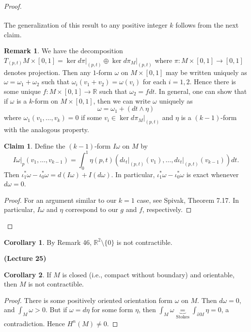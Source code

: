 \documentclass[10pt,letterpaper,cm]{nupset}
\theoremstyle{definition}
\newtheorem{claim}{Claim}
\newtheorem{remark}{Remark}
\newtheorem{corollary}{Corollary}
\newcommand{\R}{\mathbb R}
\newcommand{\1}{\mathbf{1}}
\newcommand{\0}{\vec 0}
\begin{document}
\begin{proof}
\\ \\
The generalization of this result to any positive integer $k$ follows from the next claim.
\begin{remark}
We have the decomposition $T_{(p,t)}M \times [0,1] = \ker d\pi\rvert_{(p,t)} \oplus \ker d\pi_M\rvert_{(p,t)}$ where $\pi: M \times [0,1]\to [0,1]$ denotes projection. Then any $1$-form $\omega$ on $M \times [0,1]$ may be written uniquely as $\omega = \omega_1 + \omega_2$ such that $\omega_i(v_1 + v_2) = \omega(v_i)$ for each $i=1, 2$. Hence there is some unique $f : M \times [0,1] \to \R$ such that $\omega_2 = f dt$. In general, one can show that if $\omega$ is a $k$-form on $M \times [0,1]$, then we can write $\omega$ uniquely as $$\omega = \omega_1 + (dt \wedge \eta)$$ where $\omega_1(v_1, \ldots, v_k) =0$ if some $v_i \in  \ker d\pi_M\rvert_{(p,t)}$ and $\eta$ is a $(k-1)$-form with the analogous property.
\end{remark}
\begin{claim}
Define the $(k-1)$-form $I\omega$ on $M$ by $$I \omega \rvert_p(v_1, \ldots, v_{k-1}) = \int_0^1 \eta(p, t)(d\iota_t\rvert_{(p,t)}(v_1), \ldots, d\iota_t\rvert_{(p,t)}(v_{k-1}))dt   .$$ Then $\iota^{\ast}_1\omega  - \iota^{\ast}_0 \omega = d(I\omega) + I(d\omega)$. In particular, $\iota^{\ast}_1\omega  - \iota^{\ast}_0 \omega$ is exact whenever $d\omega =0$.
\end{claim}
\begin{proof}
For an argument similar to our $k=1$ case,  see Spivak, Theorem 7.17. In particular, $I\omega$ and $\eta$ correspond to our $g$ and $f$, respectively.
\end{proof}

\end{proof}

\begin{corollary}
By Remark 46, $\R^2\setminus \{0\}$ is not contractible.
\end{corollary}

\begin{center}
{\textbf{(Lecture 25)}} 
\end{center}

\begin{corollary}
If $M$ is closed (i.e., compact without boundary) and orientable, then $M$ is not contractible.
\end{corollary}
\begin{proof}
There is some positively oriented orientation form $\omega$ on $M$. Then $d\omega =0$, and $\int_M \omega >0$. But if $\omega = d \eta$ for some form $\eta$, then $\int_M \omega \underbrace{=}_{\text{Stokes}} \int_{\partial{M}} \eta =0$, a contradiction. Hence $H^n(M) \ne 0$.
\end{proof}
\end{document}
